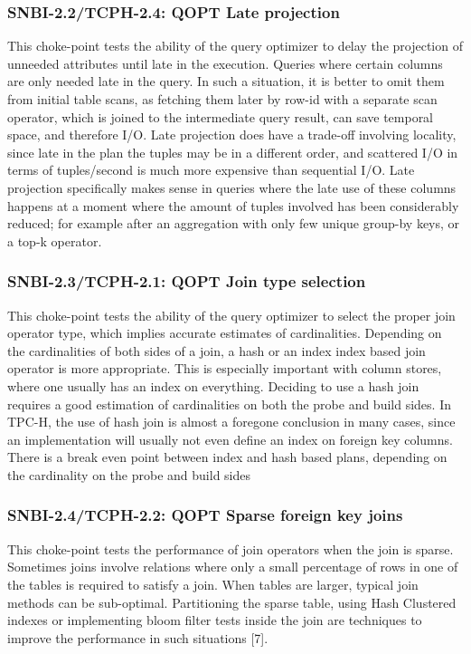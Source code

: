\subsubsection{SNBI-2.2/TCPH-2.4: QOPT Late projection}
\label{choke_point_2.2}
This choke-point tests the ability of the query optimizer to delay the projection of unneeded attributes until late in the execution. Queries where certain columns are only needed late in the query.
In such a situation, it is better to omit them from initial table scans, as fetching them later by row-id with a separate scan operator, which is joined to the intermediate query result, can save temporal space, and therefore I/O.
Late projection does have a trade-off involving locality, since late in the plan the tuples may be in a different order, and scattered I/O in terms of tuples/second is much more expensive than sequential I/O.
Late projection specifically makes sense in queries where the late use of these columns happens at a moment where the amount of tuples involved has been considerably reduced;
for example after an aggregation with only few unique group-by keys, or a top-k operator.

\subsubsection{SNBI-2.3/TCPH-2.1: QOPT Join type selection}
\label{choke_point_2.3}
This choke-point tests the ability of the query optimizer to select the proper join operator type, which implies accurate estimates of cardinalities.
Depending on the cardinalities of both sides of a join, a hash or an index index based join operator is more appropriate.
This is especially important with column stores, where one usually has an index on everything. Deciding to use a hash join requires a good estimation of cardinalities on both the probe and build sides.
In TPC-H, the use of hash join is almost a foregone conclusion in many cases, since an implementation will usually not even define an index on foreign key columns.
There is a break even point between index and hash based plans, depending on the cardinality on the probe and build sides

\subsubsection{SNBI-2.4/TCPH-2.2: QOPT Sparse foreign key joins}
\label{choke_point_2.4}
This choke-point tests the performance of join operators when the join is sparse. Sometimes joins involve relations where only a small percentage of rows in one of the tables is required to satisfy a join. When tables are larger, typical join methods can be sub-optimal. Partitioning the sparse table, using Hash Clustered indexes or implementing bloom filter tests inside the join are techniques to improve the performance in such situations [7].

